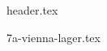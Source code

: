 \clearpage
{}
\divisorLine

{header.tex}

\begin{multicols}{2}

{7a-vienna-lager.tex}

\end{multicols}